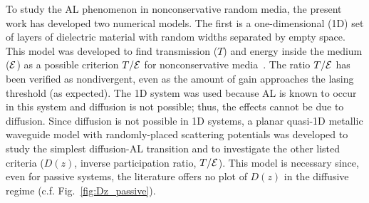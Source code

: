 To study the AL phenomenon in nonconservative random media, the present work has developed two numerical models. The first is a one-dimensional (1D) set of layers of dielectric material with random widths separated by empty space. This model was developed to find transmission ($T$) and energy inside the medium (${\cal E}$) as a possible criterion $T/{\cal E}$ for nonconservative media~\cite{2010_Payne_TE,2010_Payne_loc_criterion}. The ratio $T/{\cal E}$ has been verified as nondivergent, even as the amount of gain approaches the lasing threshold (as expected). The 1D system was used because AL is known to occur in this system and diffusion is not possible; thus, the effects cannot be due to diffusion.
Since diffusion is not possible in 1D systems, a planar quasi-1D metallic waveguide model with randomly-placed scattering potentials was developed to study the simplest diffusion-AL transition and to investigate the other listed criteria ($D(z)$, inverse participation ratio, $T/{\cal E}$). This model is necessary since, even for passive systems, the literature offers no plot of $D(z)$ in the diffusive regime (c.f. Fig.~\ref{fig:Dz_passive}).%

